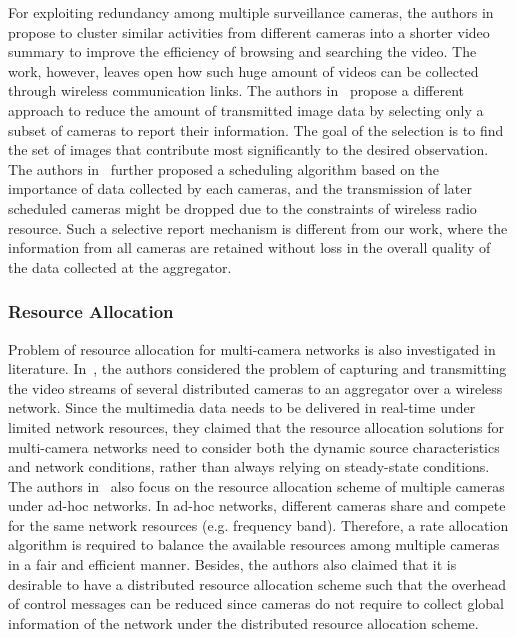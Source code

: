 For exploiting redundancy among multiple surveillance cameras, the authors in~\cite{ClusteredSynopsis} propose to cluster similar activities from different cameras into a shorter video summary to improve the efficiency of browsing and searching the video.
The work, however, leaves open how such huge amount of videos can be collected through wireless communication links.
The authors in~\cite{CameraSelection} propose a different approach to reduce the amount of transmitted image data by selecting only a subset of cameras to report their information.
The goal of the selection is to find the set of images that contribute most significantly to the desired observation.
The authors in~\cite{CorrAwareScheduling} further proposed a scheduling algorithm based on the importance of data collected by each cameras, and the transmission of later scheduled cameras might be dropped due to the constraints of wireless radio resource.
Such a selective report mechanism is different from our work, where the information from all cameras are retained without loss in the overall quality of the data collected at the aggregator.
%
\subsubsection{Resource Allocation}
Problem of resource allocation for multi-camera networks is also investigated in literature.
%
In~\cite{MWSNresourceAllocation}, the authors considered the problem of capturing and transmitting the video streams of several distributed cameras to an aggregator  over a wireless network.
Since the multimedia data needs to be delivered in real-time under limited network resources, they claimed that the resource allocation solutions for multi-camera networks need to consider both the dynamic source characteristics and network conditions, rather than always relying on steady-state conditions.
%
The authors in~\cite{rateAllocationForVideo} also focus on the resource allocation scheme of multiple cameras under ad-hoc networks.
In ad-hoc networks, different cameras share and compete for the same network resources (e.g. frequency band).
Therefore, a rate allocation algorithm is required to balance the available resources among multiple cameras in a fair and efficient manner.
Besides, the authors also claimed that it is desirable to have a distributed resource allocation scheme such that the overhead of control messages can be reduced since cameras do not require to collect global information of the network under the distributed resource allocation scheme.
%

